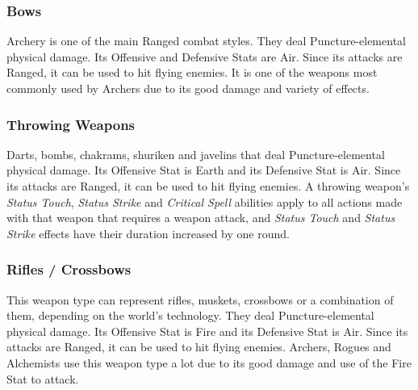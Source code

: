 \begin{tabwpn}[label=inv-katanas,range=melee,type=physical,element=cut,roll=airvsearth]
    
\end{tabwpn}
\clearpage

\subsubsection{Bows}

Archery is one of the main Ranged combat styles. They deal Puncture-elemental physical damage. Its Offensive and Defensive Stats are Air. Since its attacks are Ranged, it can be used to hit flying enemies. It is one of the weapons most commonly used by Archers due to its good damage and variety of effects.

\begin{tabwpn}[label=inv-bows,range=ranged,type=physical,element=puncture,roll=airvair]
    
\end{tabwpn}
\clearpage

\subsubsection{Throwing Weapons}

Darts, bombs, chakrams, shuriken and javelins that deal Puncture-elemental physical damage. Its Offensive Stat is Earth and its Defensive Stat is Air. Since its attacks are Ranged, it can be used to hit flying enemies. A throwing weapon's \textit{Status Touch}, \textit{Status Strike} and \textit{Critical Spell} abilities apply to all actions made with that weapon that requires a weapon attack, and \textit{Status Touch} and \textit{Status Strike} effects have their duration increased by one round.

\begin{tabwpn}[label=inv-throwing-weapons,range=ranged,type=physical,element=puncture,roll=earthvair]
    
\end{tabwpn}
\clearpage

\subsubsection{Rifles / Crossbows}

This weapon type can represent rifles, muskets, crossbows or a combination of them, depending on the world’s technology. They deal Puncture-elemental physical damage. Its Offensive Stat is Fire and its Defensive Stat is Air. Since its attacks are Ranged, it can be used to hit flying enemies. Archers, Rogues and Alchemists use this weapon type a lot due to its good damage and use of the Fire Stat to attack.

